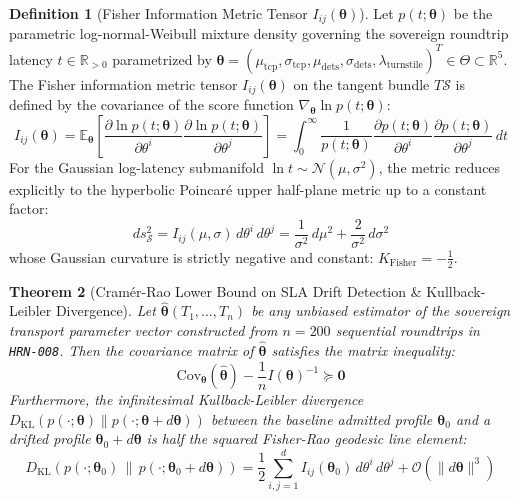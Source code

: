 \documentclass[10pt,twoside,openany]{book}
\theoremstyle{plain}
\newtheorem{theorem}{Theorem}[chapter]
\theoremstyle{definition}
\newtheorem{definition}[theorem]{Definition}
\theoremstyle{remark}
\newcommand{\R}{\mathbb{R}}
\newcommand{\E}{\mathbb{E}}
\begin{document}
\begin{definition}[Fisher Information Metric Tensor $I_{ij}(\boldsymbol{\theta})$]
Let $p(t; \boldsymbol{\theta})$ be the parametric log-normal-Weibull mixture density governing the sovereign roundtrip latency $t \in \R_{>0}$ parametrized by $\boldsymbol{\theta} = (\mu_{\mathrm{tcp}}, \sigma_{\mathrm{tcp}}, \mu_{\mathrm{dets}}, \sigma_{\mathrm{dets}}, \lambda_{\mathrm{turnstile}})^T \in \Theta \subset \R^5$. The Fisher information metric tensor $I_{ij}(\boldsymbol{\theta})$ on the tangent bundle $T\mathcal{S}$ is defined by the covariance of the score function $\nabla_{\boldsymbol{\theta}} \ln p(t; \boldsymbol{\theta})$:
\begin{equation}
I_{ij}(\boldsymbol{\theta}) = \E_{\boldsymbol{\theta}}\!\left[\frac{\partial \ln p(t; \boldsymbol{\theta})}{\partial \theta^i} \frac{\partial \ln p(t; \boldsymbol{\theta})}{\partial \theta^j}\right] = \int_0^\infty \frac{1}{p(t; \boldsymbol{\theta})} \frac{\partial p(t; \boldsymbol{\theta})}{\partial \theta^i} \frac{\partial p(t; \boldsymbol{\theta})}{\partial \theta^j}\,dt
\end{equation}
For the Gaussian log-latency submanifold $\ln t \sim \mathcal{N}(\mu, \sigma^2)$, the metric reduces explicitly to the hyperbolic Poincaré upper half-plane metric up to a constant factor:
\begin{equation}
ds_{\mathcal{S}}^2 = I_{ij}(\mu, \sigma)\,d\theta^i\,d\theta^j = \frac{1}{\sigma^2}\,d\mu^2 + \frac{2}{\sigma^2}\,d\sigma^2
\end{equation}
whose Gaussian curvature is strictly negative and constant: $K_{\mathrm{Fisher}} = -\frac{1}{2}$.
\end{definition}

\begin{theorem}[Cramér-Rao Lower Bound on SLA Drift Detection \& Kullback-Leibler Divergence]
Let $\widehat{\boldsymbol{\theta}}(T_1, \dots, T_n)$ be any unbiased estimator of the sovereign transport parameter vector constructed from $n = 200$ sequential roundtrips in \texttt{HRN-008}. Then the covariance matrix of $\widehat{\boldsymbol{\theta}}$ satisfies the matrix inequality:
\begin{equation}
\mathrm{Cov}_{\boldsymbol{\theta}}(\widehat{\boldsymbol{\theta}}) - \frac{1}{n} I(\boldsymbol{\theta})^{-1} \succeq \mathbf{0}
\end{equation}
Furthermore, the infinitesimal Kullback-Leibler divergence $D_{\mathrm{KL}}(p(\cdot; \boldsymbol{\theta}) \parallel p(\cdot; \boldsymbol{\theta} + d\boldsymbol{\theta}))$ between the baseline admitted profile $\boldsymbol{\theta}_0$ and a drifted profile $\boldsymbol{\theta}_0 + d\boldsymbol{\theta}$ is half the squared Fisher-Rao geodesic line element:
\begin{equation}
D_{\mathrm{KL}}\!\left(p(\cdot; \boldsymbol{\theta}_0) \,\middle\|\, p(\cdot; \boldsymbol{\theta}_0 + d\boldsymbol{\theta})\right) = \frac{1}{2} \sum_{i,j=1}^d I_{ij}(\boldsymbol{\theta}_0)\,d\theta^i\,d\theta^j + \mathcal{O}(\|d\boldsymbol{\theta}\|^3)
\end{equation}
\end{theorem}
\end{document}
